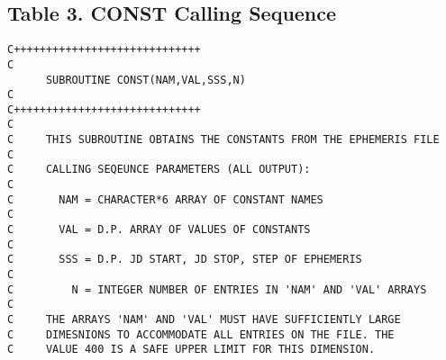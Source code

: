 \documentclass[twoside,11pt]{article}
\renewcommand{\_}{\texttt{\symbol{95}}}
\newcommand{\hdg}[1]{\vskip4pt plus2pt\leavevmode\kern-1em \underline{\large{#1}}\par}
\newcommand{\hdg}[1]{\subsection*{{#1}}}
\begin{document}
\begin{center}
\section*{Table 3. CONST Calling Sequence}
\end{center}


\begin{verbatim}
C+++++++++++++++++++++++++++++
C
      SUBROUTINE CONST(NAM,VAL,SSS,N)
C
C+++++++++++++++++++++++++++++
C
C     THIS SUBROUTINE OBTAINS THE CONSTANTS FROM THE EPHEMERIS FILE
C
C     CALLING SEQEUNCE PARAMETERS (ALL OUTPUT):
C
C       NAM = CHARACTER*6 ARRAY OF CONSTANT NAMES
C
C       VAL = D.P. ARRAY OF VALUES OF CONSTANTS
C
C       SSS = D.P. JD START, JD STOP, STEP OF EPHEMERIS
C
C         N = INTEGER NUMBER OF ENTRIES IN 'NAM' AND 'VAL' ARRAYS
C
C     THE ARRAYS 'NAM' AND 'VAL' MUST HAVE SUFFICIENTLY LARGE
C     DIMESNIONS TO ACCOMMODATE ALL ENTRIES ON THE FILE. THE
C     VALUE 400 IS A SAFE UPPER LIMIT FOR THIS DIMENSION.
\end{verbatim}


\newpage                                               %


\end{document}
